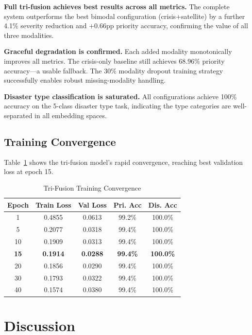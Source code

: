 \documentclass[journal]{IEEEtran}
\begin{document}
\textbf{Full tri-fusion achieves best results across all metrics.} The complete system outperforms the best bimodal configuration (crisis+satellite) by a further 4.1\% severity reduction and +0.66pp priority accuracy, confirming the value of all three modalities.

\textbf{Graceful degradation is confirmed.} Each added modality monotonically improves all metrics. The crisis-only baseline still achieves 68.96\% priority accuracy---a usable fallback. The 30\% modality dropout training strategy successfully enables robust missing-modality handling.

\textbf{Disaster type classification is saturated.} All configurations achieve 100\% accuracy on the 5-class disaster type task, indicating the type categories are well-separated in all embedding spaces.

\subsection{Training Convergence}

Table~\ref{tab:convergence} shows the tri-fusion model's rapid convergence, reaching best validation loss at epoch 15.

\begin{table}[!t]
\centering
\caption{Tri-Fusion Training Convergence}
\label{tab:convergence}
\begin{tabular}{ccccc}
\toprule
\textbf{Epoch} & \textbf{Train Loss} & \textbf{Val Loss} & \textbf{Pri. Acc} & \textbf{Dis. Acc} \\
\midrule
1  & 0.4855 & 0.0613 & 99.2\% & 100.0\% \\
5  & 0.2077 & 0.0318 & 99.4\% & 100.0\% \\
10 & 0.1909 & 0.0313 & 99.4\% & 100.0\% \\
\textbf{15} & \textbf{0.1914} & \textbf{0.0288} & \textbf{99.4\%} & \textbf{100.0\%} \\
20 & 0.1856 & 0.0290 & 99.4\% & 100.0\% \\
30 & 0.1793 & 0.0322 & 99.4\% & 100.0\% \\
40 & 0.1574 & 0.0380 & 99.4\% & 100.0\% \\
\bottomrule
\end{tabular}
\end{table}

\section{Discussion}
\end{document}
